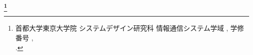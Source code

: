 \newpage
\begin{center}
 \renewcommand{\thefootnote}{\fnsymbol{footnote}}
 \Large\bfseries \jtitle \footnote[1]{首都大学東京大学院 システムデザイン研究科 情報通信システム学域 \jdoctitle, 学修番号 \studentnumber,\\ \jdate.}
 \renewcommand{\thefootnote}{\arabic{footnote}}
\end{center}

\vspace*{1truemm}

\begin{center}
 \large\jauthor
\end{center}

\vspace*{1truemm}

\begin{center}
\end{center}

\vspace*{2truemm}
\par
\jabstract
\vspace*{5truemm}

